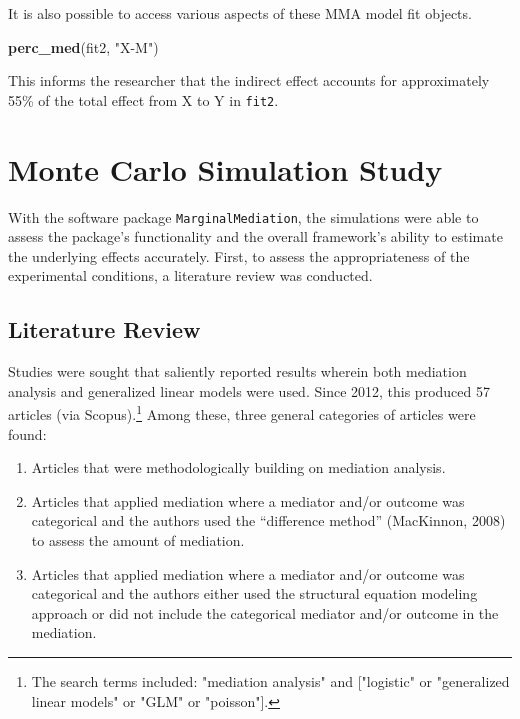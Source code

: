 \documentclass[]{DissertateUSU}
\newenvironment{Shaded}{\begin{snugshade}}{\end{snugshade}}
\newcommand{\KeywordTok}[1]{\textcolor[rgb]{0.13,0.29,0.53}{\textbf{#1}}}
\newcommand{\StringTok}[1]{\textcolor[rgb]{0.31,0.60,0.02}{#1}}
\newcommand{\NormalTok}[1]{#1}
\providecommand{\tightlist}{%
  \setlength{\itemsep}{0pt}\setlength{\parskip}{0pt}}
\let\rmarkdownfootnote\footnote%
\def\footnote{\protect\rmarkdownfootnote}
\begin{document}
\doublespacing

It is also possible to access various aspects of these MMA model fit
objects.

\begin{Shaded}
\begin{Highlighting}[]
\KeywordTok{perc_med}\NormalTok{(fit2, }\StringTok{"X-M"}\NormalTok{)}
\end{Highlighting}
\end{Shaded}

\noindent This informs the researcher that the indirect effect accounts
for approximately 55\% of the total effect from X to Y in \texttt{fit2}.

\section{Monte Carlo Simulation
Study}\label{monte-carlo-simulation-study}

With the software package \texttt{MarginalMediation}, the simulations
were able to assess the package's functionality and the overall
framework's ability to estimate the underlying effects accurately.
First, to assess the appropriateness of the experimental conditions, a
literature review was conducted.

\subsection{Literature Review}\label{literature-review-1}

Studies were sought that saliently reported results wherein both
mediation analysis and generalized linear models were used. Since 2012,
this produced 57 articles (via
Scopus).\footnote{The search terms included: "mediation analysis" and ["logistic" or "generalized linear models" or "GLM" or "poisson"].}
Among these, three general categories of articles were found:

\begin{enumerate}
\def\labelenumi{\arabic{enumi}.}
\tightlist
\item
  Articles that were methodologically building on mediation analysis.
\item
  Articles that applied mediation where a mediator and/or outcome was
  categorical and the authors used the ``difference method'' (MacKinnon,
  2008) to assess the amount of mediation.
\item
  Articles that applied mediation where a mediator and/or outcome was
  categorical and the authors either used the structural equation
  modeling approach or did not include the categorical mediator and/or
  outcome in the mediation.
\end{enumerate}
\end{document}
